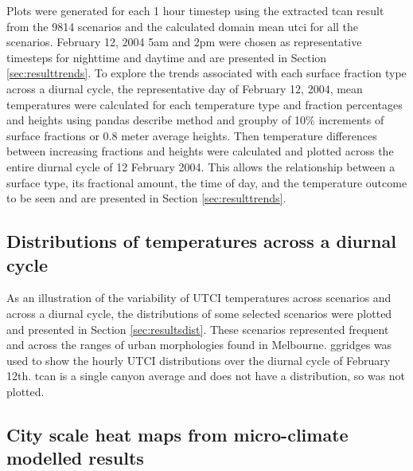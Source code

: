 \documentclass[final,3p,times,authoryear]{elsarticle}
\begin{document}
Plots were generated for each 1 hour timestep using the extracted \gls{tcan} result from the 9814 scenarios and the calculated domain mean \gls{utci} for all the scenarios. February 12, 2004 5am and 2pm were chosen as representative timesteps for nighttime and daytime and are presented in Section \ref{sec:resulttrends}. To explore the trends associated with each surface fraction type across a diurnal cycle, the representative day of February 12, 2004, mean temperatures were calculated for each temperature type and fraction percentages and heights using pandas \citep{reback2020pandas} describe method and groupby of 10\% increments of surface fractions or 0.8 meter average heights. Then temperature differences between increasing fractions and heights were calculated and plotted across the entire diurnal cycle of 12 February 2004. This allows the relationship between a surface type, its fractional amount, the time of day, and the temperature outcome to be seen and are presented in Section \ref{sec:resulttrends}.



\subsection{Distributions of temperatures across a diurnal cycle}\label{sec:methodsdist}
%
% 

As an illustration of the variability of UTCI temperatures across scenarios and across a diurnal cycle, the distributions of some selected scenarios were plotted and presented in Section \ref{sec:resultsdist}. These scenarios represented frequent and across the ranges of urban morphologies found in Melbourne. ggridges \citep{ggridges} was used to show the hourly UTCI distributions over the diurnal cycle of February 12th. \gls{tcan} is a single canyon average and does not have a distribution, so was not plotted. 

\subsection{City scale heat maps from micro-climate modelled results}\label{sec:methodsheatmaps}
\end{document}
